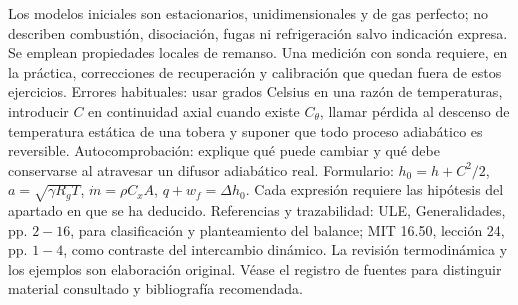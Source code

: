 \documentclass[10pt,openany]{book}
\begin{document}
Los modelos iniciales son estacionarios, unidimensionales y de gas perfecto; no describen combustión, disociación, fugas ni refrigeración salvo indicación expresa. Se emplean propiedades locales de remanso. Una medición con sonda requiere, en la práctica, correcciones de recuperación y calibración que quedan fuera de estos ejercicios.
Errores habituales: usar grados Celsius en una razón de temperaturas, introducir \(C\) en continuidad axial cuando existe \(C_\theta\), llamar pérdida al descenso de temperatura estática de una tobera y suponer que todo proceso adiabático es reversible. Autocomprobación: explique qué puede cambiar y qué debe conservarse al atravesar un difusor adiabático real.
Formulario: \(h_0=h+C^2/2\), \(a=\sqrt{\gamma R_gT}\), \(\dot m=\rho C_xA\), \(q+w_f=\Delta h_0\). Cada expresión requiere las hipótesis del apartado en que se ha deducido.
Referencias y trazabilidad: ULE, Generalidades, pp. \(2-16\), para clasificación y planteamiento del balance; MIT 16.50, lección 24, pp. \(1-4\), como contraste del intercambio dinámico. La revisión termodinámica y los ejemplos son elaboración original. Véase el registro de fuentes para distinguir material consultado y bibliografía recomendada.
\end{document}
